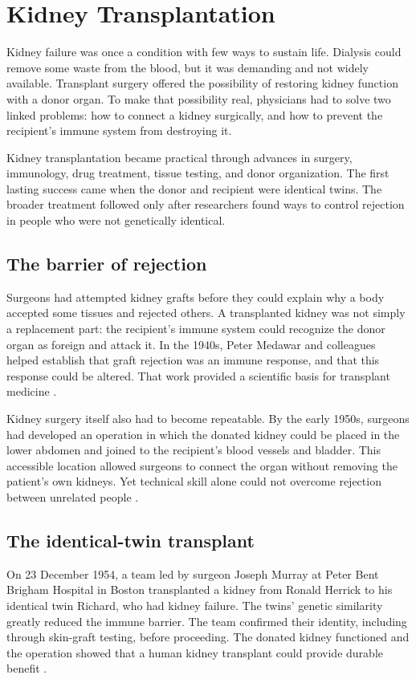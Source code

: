 \documentclass[12pt,oneside]{book}
\begin{document}
\chapter[Kidney Transplantation]{Kidney Transplantation}

Kidney failure was once a condition with few ways to sustain life. Dialysis
could remove some waste from the blood, but it was demanding and not widely
available. Transplant surgery offered the possibility of restoring kidney
function with a donor organ. To make that possibility real, physicians had
to solve two linked problems: how to connect a kidney surgically, and how to
prevent the recipient's immune system from destroying it.

Kidney transplantation became practical through advances in surgery,
immunology, drug treatment, tissue testing, and donor organization. The first
lasting success came when the donor and recipient were identical twins. The
broader treatment followed only after researchers found ways to control
rejection in people who were not genetically identical.

\section{The barrier of rejection}
Surgeons had attempted kidney grafts before they could explain why a body
accepted some tissues and rejected others. A transplanted kidney was not
simply a replacement part: the recipient's immune system could recognize the
donor organ as foreign and attack it. In the 1940s, Peter Medawar and
colleagues helped establish that graft rejection was an immune response, and
that this response could be altered. That work provided a scientific basis
for transplant medicine \cite{starzlEarlyTransplant}.

Kidney surgery itself also had to become repeatable. By the early 1950s,
surgeons had developed an operation in which the donated kidney could be
placed in the lower abdomen and joined to the recipient's blood vessels and
bladder. This accessible location allowed surgeons to connect the organ
without removing the patient's own kidneys. Yet technical skill alone could
not overcome rejection between unrelated people \cite{kidneyTransplantReview}.

\section{The identical-twin transplant}
On 23 December 1954, a team led by surgeon Joseph Murray at Peter Bent Brigham
Hospital in Boston transplanted a kidney from Ronald Herrick to his identical
twin Richard, who had kidney failure. The twins' genetic similarity greatly
reduced the immune barrier. The team confirmed their identity, including
through skin-graft testing, before proceeding. The donated kidney functioned
and the operation showed that a human kidney transplant could provide durable
benefit \cite{murrayNobel}.
\end{document}
